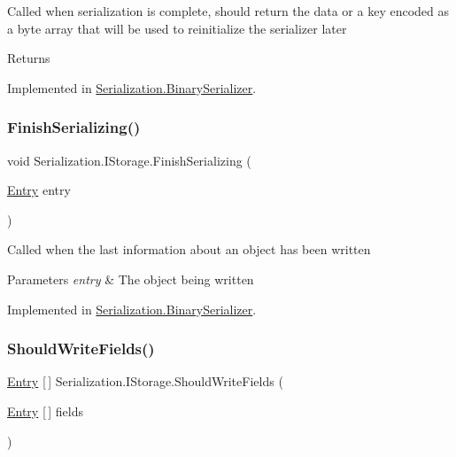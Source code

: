 Called when serialization is complete, should return the data or a key encoded as a byte array that will be used to reinitialize the serializer later 

\begin{DoxyReturn}{Returns}

\end{DoxyReturn}


Implemented in \hyperlink{class_serialization_1_1_binary_serializer_a33f7f74fffe31b07a96ab08fa545e990}{Serialization.\+Binary\+Serializer}.

\mbox{\label{interface_serialization_1_1_i_storage_a03e6828bebedaa8ec17e5f01a7cbd689}} 
\subsubsection{\texorpdfstring{Finish\+Serializing()}{FinishSerializing()}}
{\footnotesize\ttfamily void Serialization.\+I\+Storage.\+Finish\+Serializing (\begin{DoxyParamCaption}\item[{\hyperlink{class_serialization_1_1_entry}{Entry}}]{entry }\end{DoxyParamCaption})}



Called when the last information about an object has been written 


\begin{DoxyParams}{Parameters}
{\em entry} & The object being written\\
\hline
\end{DoxyParams}


Implemented in \hyperlink{class_serialization_1_1_binary_serializer_a026959038d36c07fc77d6da1345ab4d2}{Serialization.\+Binary\+Serializer}.

\mbox{\label{interface_serialization_1_1_i_storage_a0795ec3b6aa77280885c34e2822cb410}} 
\subsubsection{\texorpdfstring{Should\+Write\+Fields()}{ShouldWriteFields()}}
{\footnotesize\ttfamily \hyperlink{class_serialization_1_1_entry}{Entry} \mbox{[}$\,$\mbox{]} Serialization.\+I\+Storage.\+Should\+Write\+Fields (\begin{DoxyParamCaption}\item[{\hyperlink{class_serialization_1_1_entry}{Entry} \mbox{[}$\,$\mbox{]}}]{fields }\end{DoxyParamCaption})}



